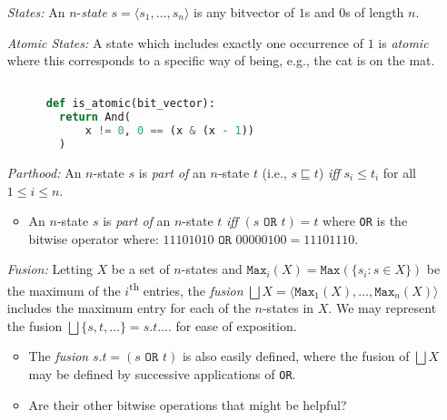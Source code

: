 \documentclass[a4paper, 11pt]{article} %
\newcommand{\tuple}[1]{\langle#1\rangle} %
\newcommand{\set}[1]{\lbrace#1\rbrace} %
\renewcommand{\max}[0]{\texttt{Max}}
\begin{document}
\begin{enumerate}
  \item[\it States:] An $n$-\textit{state} $s=\tuple{s_1,\ldots,s_n}$ is any bitvector of $1$s and $0$s of length $n$.
  \item[\it Atomic States:] A state which includes exactly one occurrence of $1$ is \textit{atomic} where this corresponds to a specific way of being, e.g., the cat is on the mat.
  \begin{lstlisting}[language=Python]

      def is_atomic(bit_vector):
        return And(
            x != 0, 0 == (x & (x - 1))
        )
    \end{lstlisting}
  \item[\it Parthood:] An $n$-state $s$ is \textit{part of} an $n$-state $t$ (i.e., $s\sqsubseteq t$) \textit{iff} $s_i\leq t_i$ for all $1\leq i\leq n$.
    \begin{itemize}
      \item An $n$-state $s$ is \textit{part of} an $n$-state $t$ \textit{iff} $(s \texttt{ OR } t) = t$  where \texttt{OR} is the bitwise operator where: $11101010 \texttt{ OR } 00000100 = 11101110$. %
    \end{itemize}
  \item[\it Fusion:] Letting $X$ be a set of $n$-states and $\max_i(X)=\max(\set{s_i:s\in X})$ be the maximum of the $i$\textsuperscript{th} entries, the \textit{fusion} $\bigsqcup X=\tuple{\max_1(X),\ldots,\max_n(X)}$ includes the maximum entry for each of the $n$-states in $X$.
    We may represent the fusion $\bigsqcup\set{s,t,\ldots}=s.t.\ldots$ for ease of exposition.
    \begin{itemize}
      \item The \textit{fusion} $s.t = (s \texttt{ OR } t)$ is also easily defined, where the fusion of $\bigsqcup X$ may be defined by successive applications of \texttt{OR}.
      \item Are their other bitwise operations that might be helpful?

\end{itemize}
\end{enumerate}
\end{document}
